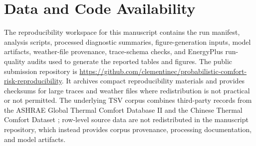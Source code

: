 \documentclass[preprint,3p,12pt]{elsarticle}
\begin{document}
\linenumbers





\clearpage


\section*{Data and Code Availability}
The reproducibility workspace for this manuscript contains the run manifest, analysis scripts, processed diagnostic summaries, figure-generation inputs, model artifacts, weather-file provenance, trace-schema checks, and EnergyPlus run-quality audits used to generate the reported tables and figures. The public submission repository is \url{https://github.com/clementinec/probabilistic-comfort-risk-reproducibility}. It archives compact reproducibility materials and provides checksums for large traces and weather files where redistribution is not practical or not permitted. The underlying TSV corpus combines third-party records from the ASHRAE Global Thermal Comfort Database II \citep{Foldvary2018GlobalDB} and the Chinese Thermal Comfort Dataset \citep{Yang2023ChineseDataset}; row-level source data are not redistributed in the manuscript repository, which instead provides corpus provenance, processing documentation, and model artifacts.

\clearpage


\end{document}
